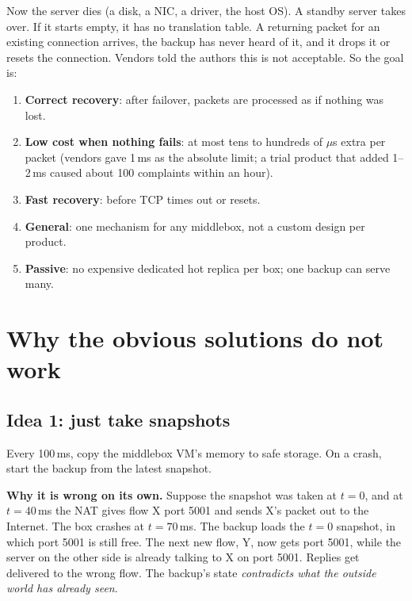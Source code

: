 Now the server dies (a disk, a NIC, a driver, the host OS). A standby server takes over. If it starts empty, it has no
translation table. A returning packet for an existing connection arrives, the backup has never heard of it, and it drops it or
resets the connection. Vendors told the authors this is not acceptable. So the goal is:

\begin{keybox}
\begin{enumerate}
  \item \textbf{Correct recovery}: after failover, packets are processed as if nothing was lost.
  \item \textbf{Low cost when nothing fails}: at most tens to hundreds of $\mu$s extra per packet (vendors gave 1\,ms as the absolute limit;
        a trial product that added 1--2\,ms caused about 100 complaints within an hour).
  \item \textbf{Fast recovery}: before TCP times out or resets.
  \item \textbf{General}: one mechanism for any middlebox, not a custom design per product.
  \item \textbf{Passive}: no expensive dedicated hot replica per box; one backup can serve many.
\end{enumerate}
\end{keybox}

\section{Why the obvious solutions do not work}

\subsection{Idea 1: just take snapshots}
Every 100\,ms, copy the middlebox VM's memory to safe storage. On a crash, start the backup from the latest snapshot.

\textbf{Why it is wrong on its own.} Suppose the snapshot was taken at $t=0$, and at $t=40$\,ms the NAT gives flow X port 5001
and sends X's packet out to the Internet. The box crashes at $t=70$\,ms. The backup loads the $t=0$ snapshot, in which port 5001 is
still free. The next new flow, Y, now gets port 5001, while the server on the other side is already talking to X on port 5001.
Replies get delivered to the wrong flow. The backup's state \emph{contradicts what the outside world has already seen}.

